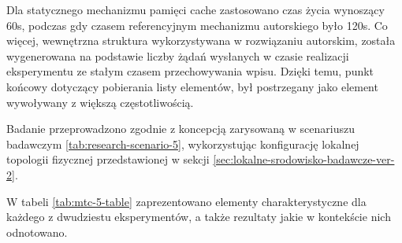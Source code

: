 Dla statycznego mechanizmu pamięci cache zastosowano czas życia wynoszący 60s, podczas gdy czasem referencyjnym mechanizmu autorskiego było 120s. Co więcej, wewnętrzna struktura wykorzystywana w rozwiązaniu autorskim, została wygenerowana na podstawie liczby żądań wysłanych w czasie realizacji eksperymentu ze stałym czasem przechowywania wpisu. Dzięki temu, punkt końcowy dotyczący pobierania listy elementów, był postrzegany jako element wywoływany z większą częstotliwością.

Badanie przeprowadzono zgodnie z koncepcją zarysowaną w scenariuszu badawczym \ref{tab:research-scenario-5}, wykorzystując konfigurację lokalnej topologii fizycznej przedstawionej w sekcji \ref{sec:lokalne-srodowisko-badawcze-ver-2}.

W tabeli \ref{tab:mtc-5-table} zaprezentowano elementy charakterystyczne dla każdego z dwudziestu eksperymentów, a także rezultaty jakie w kontekście nich odnotowano.

